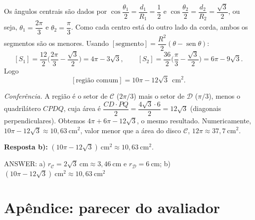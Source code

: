 \documentclass{article}%
\begin{document}
Os ângulos centrais são dados por $\cos\dfrac{\theta_1}{2}=\dfrac{d_1}{R_1}=\dfrac12$ e $\cos\dfrac{\theta_2}{2}=\dfrac{d_2}{R_2}=\dfrac{\sqrt{3}}{2}$, ou seja, $\theta_1=\dfrac{2\pi}{3}$ e $\theta_2=\dfrac{\pi}{3}$. Como cada centro está do outro lado da corda, ambos os segmentos são os menores. Usando $[\text{segmento}]=\dfrac{R^2}{2}(\theta-\operatorname{sen}\theta)$:
$$[S_1]=\frac{12}{2}\Big(\frac{2\pi}{3}-\frac{\sqrt{3}}{2}\Big)=4\pi-3\sqrt{3},\qquad [S_2]=\frac{36}{2}\Big(\frac{\pi}{3}-\frac{\sqrt{3}}{2}\Big)=6\pi-9\sqrt{3}.$$
Logo
$$[\text{região comum}]=10\pi-12\sqrt{3}\ \ \mathrm{cm}^2.$$

\emph{Conferência.} A região é o setor de $\mathcal{C}$ ($2\pi/3$) mais o setor de $\mathcal{D}$ ($\pi/3$), menos o quadrilátero $CPDQ$, cuja área é $\dfrac{CD\cdot PQ}{2}=\dfrac{4\sqrt{3}\cdot 6}{2}=12\sqrt{3}$ (diagonais perpendiculares). Obtemos $4\pi+6\pi-12\sqrt{3}$, o mesmo resultado. Numericamente, $10\pi-12\sqrt{3}\approx 10{,}63\ \mathrm{cm}^2$, valor menor que a área do disco $\mathcal{C}$, $12\pi\approx 37{,}7\ \mathrm{cm}^2$.

\textbf{Resposta b):} $(10\pi-12\sqrt{3})\ \mathrm{cm}^2\approx 10{,}63\ \mathrm{cm}^2$.

\noindent ANSWER: a) $r_{\mathcal{C}}=2\sqrt{3}\ \mathrm{cm}\approx 3{,}46\ \mathrm{cm}$ e $r_{\mathcal{D}}=6\ \mathrm{cm}$; b) $(10\pi-12\sqrt{3})\ \mathrm{cm}^2\approx 10{,}63\ \mathrm{cm}^2$
%
\newpage%
\section*{Apêndice: parecer do avaliador}%
\end{document}
